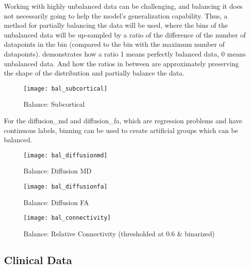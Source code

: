Working with highly unbalanced data can be challenging, and balancing it does not necessarily going to help the model's generalization capability. Thus, a method for partially balancing the data will be used, where the bins of the unbalanced data will be up-sampled by a ratio of the difference of the number of datapoints in the bin (compared to the bin with the maximum number of datapoints).  demonstrates how a ratio 1 means perfectly balanced data, 0 means unbalanced data. And how the ratios in between are approximately preserving the shape of the distribution and partially balance the data.

\begin{figure}[H]
\centering
\texttt{[image: bal\_subcortical]}
\caption{Balance: Subcortical}
\label{fig:bal_sub}
\end{figure}

For the diffusion\_md and diffusion\_fa, which are regression problems and have continuous labels, binning can be used to create artificial groups which can be balanced.

\begin{figure}[H]
\centering
\texttt{[image: bal\_diffusionmd]}
\caption{Balance: Diffusion MD}
\end{figure}

\begin{figure}[H]
\centering
\texttt{[image: bal\_diffusionfa]}
\caption{Balance: Diffusion FA}
\end{figure}

\begin{figure}[H]
\centering
\texttt{[image: bal\_connectivity]}
\caption{Balance: Relative Connectivity (thresholded at $0.6$ \& binarized)}
\end{figure}

\subsection{Clinical Data}

